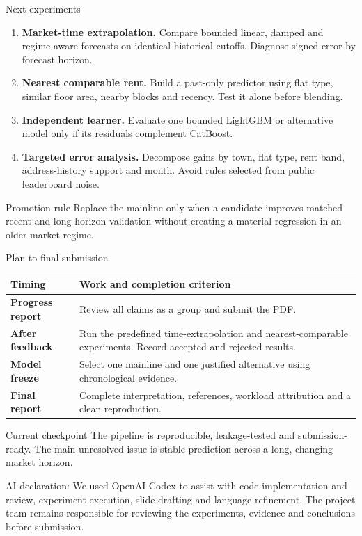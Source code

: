 \documentclass[xcolor=dvipsnames,aspectratio=43]{beamer}
\begin{document}
\begin{frame}{Next experiments}
\begin{enumerate}
  \item \textbf{Market-time extrapolation.} Compare bounded linear, damped and regime-aware forecasts on identical historical cutoffs. Diagnose signed error by forecast horizon.
  \item \textbf{Nearest comparable rent.} Build a past-only predictor using flat type, similar floor area, nearby blocks and recency. Test it alone before blending.
  \item \textbf{Independent learner.} Evaluate one bounded LightGBM or alternative model only if its residuals complement CatBoost.
  \item \textbf{Targeted error analysis.} Decompose gains by town, flat type, rent band, address-history support and month. Avoid rules selected from public leaderboard noise.
\end{enumerate}
\vspace{0.2cm}
\begin{block}{Promotion rule}
  Replace the mainline only when a candidate improves matched recent and long-horizon validation without creating a material regression in an older market regime.
\end{block}
\end{frame}

\begin{frame}{Plan to final submission}
\footnotesize
\begin{tabularx}{\textwidth}{>{\bfseries}p{}>{\raggedright\arraybackslash}X}
  \toprule
  Timing & Work and completion criterion \\
  \midrule
  Progress report & Review all claims as a group and submit the PDF. \\
  After feedback & Run the predefined time-extrapolation and nearest-comparable experiments. Record accepted and rejected results. \\
  Model freeze & Select one mainline and one justified alternative using chronological evidence. \\
  Final report & Complete interpretation, references, workload attribution and a clean reproduction. \\
  \bottomrule
\end{tabularx}
\vspace{0.35cm}
\begin{exampleblock}{Current checkpoint}
  The pipeline is reproducible, leakage-tested and submission-ready. The main unresolved issue is stable prediction across a long, changing market horizon.
\end{exampleblock}
\vfill
{\raggedright\scriptsize\color{gray}AI declaration: We used OpenAI Codex to assist with code implementation and review, experiment execution, slide drafting and language refinement. The project team remains responsible for reviewing the experiments, evidence and conclusions before submission.\par}
\end{frame}
\end{document}

